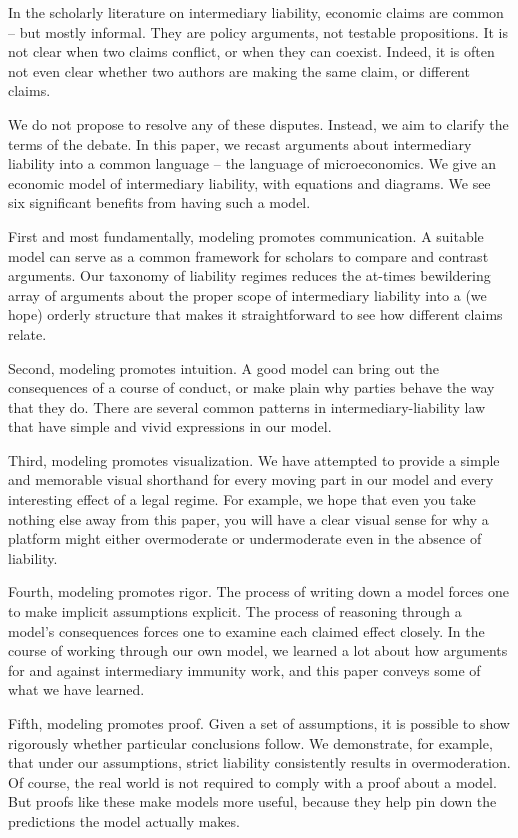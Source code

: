 In the scholarly literature on intermediary liability, economic claims are common -- but mostly informal. They are policy arguments, not testable propositions. It is not clear when two claims conflict, or when they can coexist. Indeed, it is often not even clear whether two authors are making the same claim, or different claims.

We do not propose to resolve any of these disputes. Instead, we aim to clarify the terms of the debate. In this paper, we recast arguments about intermediary liability into a common language -- the language of microeconomics. We give an economic model of intermediary liability, with equations and diagrams. We see six significant benefits from having such a model.

First and most fundamentally, modeling promotes communication. A suitable model can serve as a common framework for scholars to compare and contrast arguments. Our taxonomy of liability regimes reduces the at-times bewildering array of arguments about the proper scope of intermediary liability into a (we hope) orderly structure that makes it straightforward to see how different claims relate.

Second, modeling promotes intuition. A good model can bring out the consequences of a course of conduct, or make plain why parties behave the way that they do. There are several common patterns in intermediary-liability law that have simple and vivid expressions in our model.

Third, modeling promotes visualization. We have attempted to provide a simple and memorable visual shorthand for every moving part in our model and every interesting effect of a legal regime. For example, we hope that even you take nothing else away from this paper, you will have a clear visual sense for why a platform might either overmoderate or undermoderate even in the absence of liability.

Fourth, modeling promotes rigor. The process of writing down a model forces one to make implicit assumptions explicit. The process of reasoning through a model's consequences forces one to examine each claimed effect closely. In the course of working through our own model, we learned a lot about how arguments for and against intermediary immunity work, and this paper conveys some of what we have learned.

Fifth, modeling promotes proof. Given a set of assumptions, it is possible to show rigorously whether particular conclusions follow. We demonstrate, for example, that under our assumptions, strict liability consistently results in overmoderation. Of course, the real world is not required to comply with a proof about a model. But proofs like these make models more useful, because they help pin down the predictions the model actually makes.

